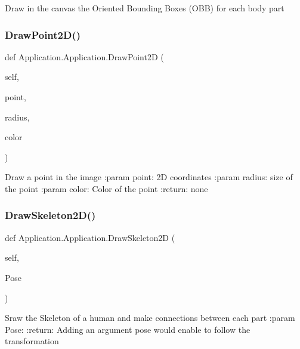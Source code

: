 \begin{DoxyVerb}Draw in the canvas the Oriented Bounding Boxes (OBB) for each body part
\end{DoxyVerb}
 \mbox{\label{class_application_1_1_application_a6564aeb78321ccf643be0b90fe2b388e}} 
\subsubsection{\texorpdfstring{Draw\+Point2\+D()}{DrawPoint2D()}}
{\footnotesize\ttfamily def Application.\+Application.\+Draw\+Point2D (\begin{DoxyParamCaption}\item[{}]{self,  }\item[{}]{point,  }\item[{}]{radius,  }\item[{}]{color }\end{DoxyParamCaption})}

\begin{DoxyVerb}Draw a point in the image
:param point: 2D coordinates
:param radius: size of the point
:param color: Color of the point
:return: none
\end{DoxyVerb}
 \mbox{\label{class_application_1_1_application_af36ed2ae19b0450de779306b410dee6f}} 
\subsubsection{\texorpdfstring{Draw\+Skeleton2\+D()}{DrawSkeleton2D()}}
{\footnotesize\ttfamily def Application.\+Application.\+Draw\+Skeleton2D (\begin{DoxyParamCaption}\item[{}]{self,  }\item[{}]{Pose }\end{DoxyParamCaption})}

\begin{DoxyVerb}Sraw the Skeleton of a human and make connections between each part
:param Pose:
:return:
Adding an argument pose would enable to follow the transformation
\end{DoxyVerb}
 \mbox{\label{class_application_1_1_application_a24fadbdd7cf0f4318724996b626e8c66}} 
